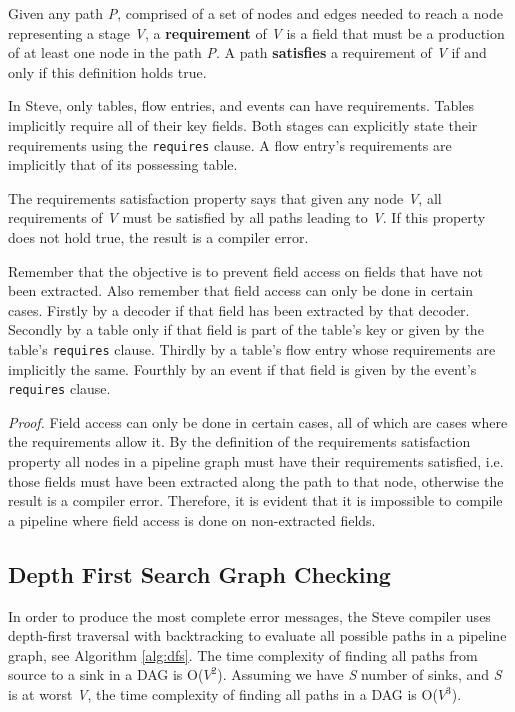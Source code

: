 Given any path \textit{P}, comprised of a set of nodes and edges needed to reach a node representing a stage \textit{V}, a \textbf{requirement} of \textit{V} is a field that must be a production of at least one node in the path \textit{P}. A path \textbf{satisfies} a requirement of \textit{V} if and only if this definition holds true.

In Steve, only tables, flow entries, and events can have requirements. Tables implicitly require all of their key fields. Both stages can explicitly state their requirements using the \texttt{\color{blue}requires} clause. A flow entry's requirements are implicitly that of its possessing table.

The requirements satisfaction property says that given any node \textit{V}, all requirements of \textit{V} must be satisfied by all paths leading to \textit{V}. If this property does not hold true, the result is a compiler error.

Remember that the objective is to prevent field access on fields that have not been extracted. Also remember that field access can only be done in certain cases. Firstly by a decoder if that field has been extracted by that decoder. Secondly by a table only if that field is part of the table's key or given by the table's \texttt{\color{blue}requires} clause. Thirdly by a table's flow entry whose requirements are implicitly the same. Fourthly by an event if that field is given by the event's \texttt{\color{blue}requires} clause.

\textit{Proof.} Field access can only be done in certain cases, all of which are cases where the requirements allow it. By the definition of the requirements satisfaction property all nodes in a pipeline graph must have their requirements satisfied, i.e. those fields must have been extracted along the path to that node, otherwise the result is a compiler error. Therefore, it is evident that it is impossible to compile a pipeline where field access is done on non-extracted fields.

\subsection{Depth First Search Graph Checking} \label{dfs_desc}

In order to produce the most complete error messages, the Steve compiler uses depth-first traversal with backtracking to evaluate all possible paths in a pipeline graph, see Algorithm \ref{alg:dfs}. The time complexity of finding all paths from source to a sink in a DAG is O($V^2$). Assuming we have \textit{S} number of sinks, and \textit{S} is at worst \textit{V}, the time complexity of finding all paths in a DAG is O($V^3$).

